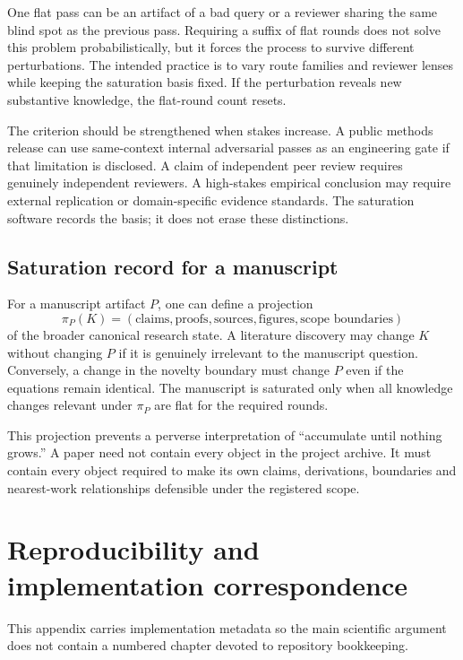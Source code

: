 One flat pass can be an artifact of a bad query or a reviewer sharing the same blind spot as the previous pass. Requiring a suffix of flat rounds does not solve this problem probabilistically, but it forces the process to survive different perturbations. The intended practice is to vary route families and reviewer lenses while keeping the saturation basis fixed. If the perturbation reveals new substantive knowledge, the flat-round count resets.

The criterion should be strengthened when stakes increase. A public methods release can use same-context internal adversarial passes as an engineering gate if that limitation is disclosed. A claim of independent peer review requires genuinely independent reviewers. A high-stakes empirical conclusion may require external replication or domain-specific evidence standards. The saturation software records the basis; it does not erase these distinctions.

\subsection{Saturation record for a manuscript}

For a manuscript artifact \(P\), one can define a projection
\[
\pi_P(K)=
(\text{claims},\text{proofs},\text{sources},\text{figures},\text{scope boundaries})
\]
of the broader canonical research state. A literature discovery may change \(K\) without changing \(P\) if it is genuinely irrelevant to the manuscript question. Conversely, a change in the novelty boundary must change \(P\) even if the equations remain identical. The manuscript is saturated only when all knowledge changes relevant under \(\pi_P\) are flat for the required rounds.

This projection prevents a perverse interpretation of ``accumulate until nothing grows.'' A paper need not contain every object in the project archive. It must contain every object required to make its own claims, derivations, boundaries and nearest-work relationships defensible under the registered scope.

\section{Reproducibility and implementation correspondence}

This appendix carries implementation metadata so the main scientific argument does not contain a numbered chapter devoted to repository bookkeeping.

